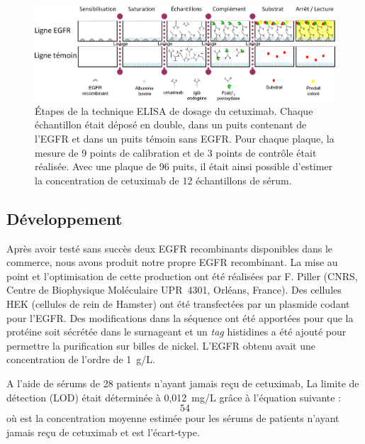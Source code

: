 \begin{landscape}
\begin{figure}[htbp]
	\centering
		\includegraphics[width=20cm]{figures/raster/Figure17_ELISA}
	\caption[Étapes de la technique ELISA de dosage du cetuximab.]{Étapes de la technique ELISA de dosage du cetuximab. Chaque échantillon était déposé en double, dans un puits contenant de l'EGFR et dans un puits témoin sans EGFR. Pour chaque plaque, la mesure de 9 points de calibration et de 3 points de contrôle était réalisée. Avec une plaque de 96 puits, il était ainsi possible d'estimer la concentration de cetuximab de 12 échantillons de sérum.}
	\label{fig:17}
\end{figure}
\end{landscape}

\subsection{Développement}
Après avoir testé sans succès deux EGFR recombinants disponibles dans le commerce, nous avons produit notre propre EGFR recombinant. La mise au point et l'optimisation de cette production ont été réalisées par F. Piller (CNRS, Centre de Biophysique Moléculaire UPR~4301, Orléans, France). Des cellules HEK (cellules de rein de Hamster) ont été transfectées par un plasmide codant pour l'EGFR. Des modifications dans la séquence ont été apportées pour que la protéine soit sécrétée dans le surnageant et un \textit{tag} histidines a été ajouté pour permettre la purification sur billes de nickel. L'EGFR obtenu avait une concentration de l'ordre de 1~g/L.

A l'aide de sérums de 28 patients n'ayant jamais reçu de cetuximab, La limite de détection (LOD) était déterminée à 0,012~mg/L grâce à l'équation suivante :
\begin{equation}
54
\end{equation}
où  est la concentration moyenne estimée pour les sérums de patients n'ayant jamais reçu de cetuximab et  est l'écart-type. 


